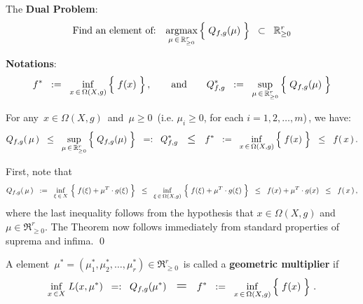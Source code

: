 \begin{definition}
\vskip 0.5cm
\noindent
The \textbf{Dual Problem}:
\begin{equation*}
\textnormal{Find an element of:}
\quad
	\underset{\mu\,\in\,\Re_{\geq 0}^{r}}{\argmax}\left\{\;
	\overset{{\color{white}.}}{Q_{f,g}(\mu)}
	\;\right\}
\;\; \subset \;\;
	\Re^{r}_{\geq 0}
\end{equation*}

\vskip 0.5cm
\noindent
\textbf{Notations}:
\begin{equation*}
f^{*}
\;\; := \;\;
	\underset{x\,\in\,\Omega(X,g)}{\inf}\left\{\;
		\overset{{\color{white}.}}{f(x)}
		\;\right\},
\quad\quad
\textnormal{and}
\quad\quad
Q_{f,g}^{*}
\;\; := \;\;
	\underset{\mu\,\in\,\Re_{\geq 0}^{r}}{\sup}\left\{\;
	\overset{{\color{white}.}}{Q_{f,g}(\mu)}
	\;\right\}
\end{equation*}
\end{definition}

\vskip 0.5cm
\begin{theorem}
\mbox{}
\vskip 0.1cm
\noindent
For any \,$x \in \Omega(X,g)$\, and \,$\mu \geq 0$\, (i.e. $\mu_{i} \geq 0$, for each $i =1,2,\ldots,m$)\,,
we have:
\begin{equation*}
Q_{f,g}\!\left(\,\mu\,\right)
\;\; \leq \;\;
	\underset{\mu\,\in\,\Re_{\geq 0}^{r}}{\sup}\left\{\;
		\overset{{\color{white}.}}{Q_{f,g}(\mu)}
		\;\right\}
\;\; =: \;\;
	Q_{f,g}^{*}
\quad\textnormal{\large$\leq$}\quad
	f^{*}
\;\; := \;\;
	\underset{x\,\in\,\Omega(X,g)}{\inf}\left\{\;
		\overset{{\color{white}.}}{f(x)}
		\;\right\}
\;\; \leq \;\;
	f(\,x\,)\,.
\end{equation*}
\end{theorem}
\proof
First, note that
\begin{equation*}
Q_{f,g}\!\left(\,\mu\,\right)
\;\; := \;\;
	\underset{\xi\,\in\,X}{\inf}\,\left\{\;f(\xi) \overset{{\color{white}.}}{+} \mu^{T}\cdot g(\xi)\;\right\}
\;\; \leq \;\;
	\underset{\xi\,\in\,\Omega(X,g)}{\inf}\,\left\{\;f(\xi) \overset{{\color{white}.}}{+} \mu^{T}\cdot g(\xi)\;\right\}
\;\; \leq \;\;
	f(x) \overset{{\color{white}.}}{+} \mu^{T}\cdot g(x)
\;\; \leq \;\;
	f(\,x\,)\,,
\end{equation*}
where the last inequality follows from the hypothesis that $x \in \Omega(X,g)$ and $\mu \in \Re_{\geq 0}^{r}$.
The Theorem now follows immediately from standard properties of suprema and infima.
\qed

\vskip 0.5cm
\begin{definition}
\mbox{}
\vskip 0.1cm
\noindent
A element
\,$\mu^{*} = (\mu_{1}^{*},\mu_{2}^{*},\ldots,\mu_{r}^{*}) \in \Re_{\geq 0}^{r}$\,
is called a \textbf{geometric multiplier} if
\begin{equation*}
	\underset{x\,\in X}{\inf}\;L(x,\mu^{*})
\;\; =: \;\;
	Q_{f,g}(\mu^{*})
\quad\textnormal{\Large$=$}\quad
	f^{*}
\;\; := \;\;
	\underset{x\,\in\,\Omega(X,g)}{\inf}\left\{\;
		\overset{{\color{white}.}}{f(x)}
		\;\right\}\,.
\end{equation*}
\end{definition}

